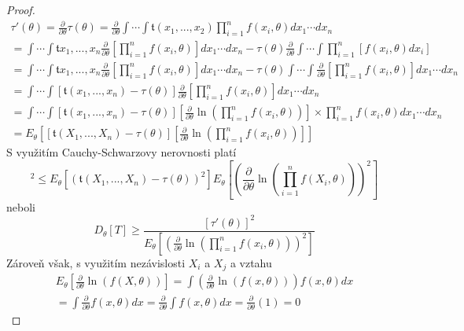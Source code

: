 \begin{proof}
\begin{gather*}
\tau'(\theta) = \frac{\partial}{\partial \theta} \tau(\theta) = \frac{\partial}{\partial \theta} \int \cdots \int \mathfrak{t}(x_1, ..., x_2) \prod_{i = 1}^n f(x_i, \theta) dx_1 \cdots dx_n\\
= \int \cdots \int \mathfrak{t}{x_1, ..., x_n}\frac{\partial}{\partial \theta}\left[\prod_{i = 1}^n f(x_i, \theta) \right] dx_1 \cdots dx_n - \tau(\theta)\frac{\partial}{\partial \theta} \int \cdots \int \prod_{i = 1}^n [f(x_i, \theta)dx_i]\\
= \int \cdots \int \mathfrak{t}{x_1, ..., x_n}\frac{\partial}{\partial \theta}\left[\prod_{i = 1}^n f(x_i, \theta) \right] dx_1 \cdots dx_n - \tau(\theta) \int \cdots \int \frac{\partial}{\partial \theta}\left[\prod_{i = 1}^n f(x_i, \theta)\right]dx_1 \cdots dx_n\\
= \int \cdots \int[\mathfrak{t}(x_1, ..., x_n) - \tau(\theta)]\frac{\partial}{\partial \theta}\left[\prod_{i = 1}^n f(x_i, \theta)\right]dx_1 \cdots dx_n\\
= \int \cdots \int[\mathfrak{t}(x_1, ..., x_n) - \tau(\theta)]\left[\frac{\partial}{\partial \theta}\ln \left(\prod_{i = 1}^n f(x_i, \theta)\right)\right] \times \prod_{i = 1}^n f(x_i, \theta) dx_1 \cdots dx_n\\
= E_{\theta}\left[[\mathfrak{t}(X_1, ..., X_n) - \tau(\theta)]\left[\frac{\partial}{\partial \theta} \ln \left(\prod_{i = 1}^n f(x_i, \theta)\right)\right]\right]
\end{gather*}
S využitím Cauchy-Schwarzovy nerovnosti platí
\begin{equation*}
[\tau'(\theta)]^2 \le E_{\theta}[(\mathfrak{t}(X_1, ..., X_n) - \tau(\theta))^2]E_{\theta}\left[\left(\frac{\partial}{\partial \theta}\ln \left(\prod_{i = 1}^n f(X_i, \theta) \right)\right)^2\right]
\end{equation*}
neboli
\begin{equation*}
D_{\theta}[T] \ge \frac{[\tau'(\theta)]^2}{E_{\theta}\left[\left(\frac{\partial}{\partial \theta}\ln \left(\prod_{i = 1}^n f(x_i, \theta) \right) \right)^2 \right]}
\end{equation*}
Zároveň však, s využitím nezávislosti $X_i$ a $X_j$ a vztahu
\begin{gather*}
E_{\theta} \left[\frac{\partial}{\partial \theta} \ln \left(f(X, \theta)\right)\right] = \int\left(\frac{\partial}{\partial \theta} \ln \left(f(x, \theta)\right)\right)f(x, \theta)dx\\
= \int \frac{\partial}{\partial \theta} f(x, \theta)dx = \frac{\partial}{\partial \theta}\int f(x, \theta)dx = \frac{\partial}{\partial \theta}(1) = 0

\end{gather*}
\end{proof}
